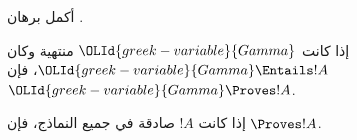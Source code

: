 \documentclass[../../../include/open-logic-section]{subfiles}
\begin{document}
\begin{prob}
أكمل برهان .
\end{prob}

\begin{cor}
إذا كانت $\OLId{greek-variable}{Gamma}$ منتهية وكان $\OLId{greek-variable}{Gamma} \Entails !A$، فإن
$\OLId{greek-variable}{Gamma} \Proves !A$.
\end{cor}

\begin{cor}
إذا كانت $!A$ صادقة في جميع النماذج، فإن $\Proves !A$.
\end{cor}
\end{document}
